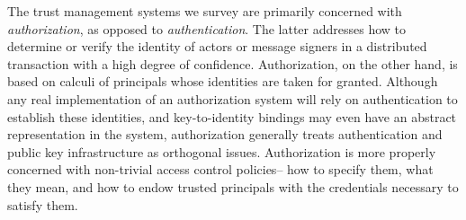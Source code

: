 The trust management systems we survey are primarily concerned with
\emph{authorization}, as opposed to \emph{authentication}.  The latter
addresses how to determine or verify the identity of actors or message
signers in a distributed transaction with a high degree of confidence.
Authorization, on the other hand, is based on calculi of principals
whose identities are taken for granted.  Although any real
implementation of an authorization system will rely on authentication
to establish these identities, and key-to-identity bindings may even
have an abstract representation in the system, authorization generally
treats authentication and public key infrastructure as orthogonal
issues.  Authorization is more properly concerned with non-trivial
access control policies-- how to specify them, what they mean, and how
to endow trusted principals with the credentials necessary to satisfy
them.

